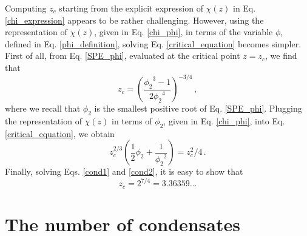 \documentclass[aps,pre,twocolumn,superscriptaddress,showpacs]{revtex4-1}
\newcommand{\be}{\begin{equation}}
\newcommand{\ee}{\end{equation}}
\begin{document}
Computing $z_c$ starting from the explicit expression of $\chi(z)$ in Eq. \eqref{chi_expression} appears to be rather challenging. However, using the representation of $\chi(z)$, given in Eq. \eqref{chi_phi}, in terms of the variable $\phi$, defined in Eq. \eqref{phi_definition}, solving Eq. \eqref{critical_equation} becomes simpler. First of all, from Eq. \eqref{SPE_phi}, evaluated at the critical point $z=z_c$, we find that
\be
z_c=\left(\frac{{\phi_2}^3-1}{2{\phi_2}^4}\right)^{-3/4}\,,
\label{cond1}
\ee
where we recall that $\phi_2$ is the smallest positive root of Eq. \eqref{SPE_phi}. Plugging the representation of $\chi(z)$ in terms of $\phi_2$, given in Eq. \eqref{chi_phi}, into Eq. \eqref{critical_equation}, we obtain
\be 
z_c^{2/3}\left(\frac12 \phi_2 +\frac{1}{{\phi_2}^2}\right)=z_c^2/4\,.
\label{cond2}
\ee
Finally, solving Eqs. \eqref{cond1} and \eqref{cond2}, it is easy to show that
\begin{equation}
z_c=2^{7/4}=3.36359\ldots
\end{equation}


\section{The number of condensates}

\label{app:one_cond}
\end{document}
